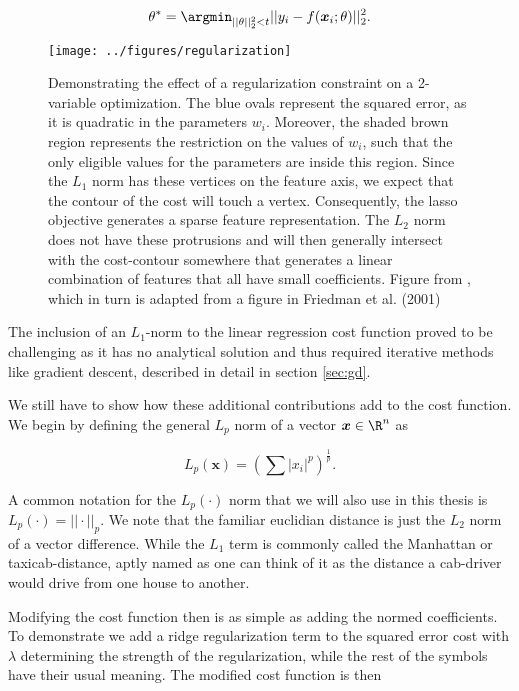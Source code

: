 \begin{align}
\theta^* = \argmin_{||\theta||_2^2<t} ||y_i - f(\boldsymbol{x}_i; \theta)||_2^2.
\end{align}

\begin{figure}
\centering
\texttt{[image: ../figures/regularization]}
\caption[Geometric interpretation of the $L_1$ and $L_2$ regularization and the squared error cost]{Demonstrating the effect of a regularization constraint on a 2-variable optimization. The blue ovals represent the squared error, as it is quadratic in the parameters $w_i$. Moreover, the shaded brown region represents the restriction on the values of $w_i$, such that the only eligible values for the parameters are inside this region. Since the $L_1$ norm has these vertices on the feature axis, we expect that the contour of the cost will touch a vertex. Consequently, the lasso objective generates a sparse feature representation. The $L_2$ norm does not have these protrusions and will then generally intersect with the cost-contour somewhere that generates a linear combination of features that all have small coefficients. Figure from \citet{Mehta2019}, which in turn is adapted from a figure in Friedman et al. (2001)}\label{fig:regularization}
\end{figure}

The inclusion of an $L_1$-norm to the linear regression cost function proved to be challenging as it has no analytical solution and thus required iterative methods like gradient descent, described in detail in section \ref{sec:gd}. 

We still have to show how these additional contributions add to the cost function. We begin by defining the general $L_p$ norm of a vector $\boldsymbol{x} \in \R^n$ as

\begin{equation}
L_p(\boldsymbol{x}) = \left(\sum |x_i|^p\right)^{\frac{1}{p}}.
\end{equation}

\noindent A common notation for the $L_p(\cdot)$ norm that we will also use in this thesis is $L_p(\cdot) = ||\cdot||_p$. We note that the familiar euclidian distance is just the $L_2$ norm of a vector difference. While the $L_1$ term is commonly called the Manhattan or taxicab-distance, aptly named as one can think of it as the distance a cab-driver would drive from one house to another.

Modifying the cost function then is as simple as adding the normed coefficients. To demonstrate we add a ridge regularization term to the squared error cost with $\lambda$ determining the strength of the regularization, while the rest of the symbols have their usual meaning. The modified cost function is then

